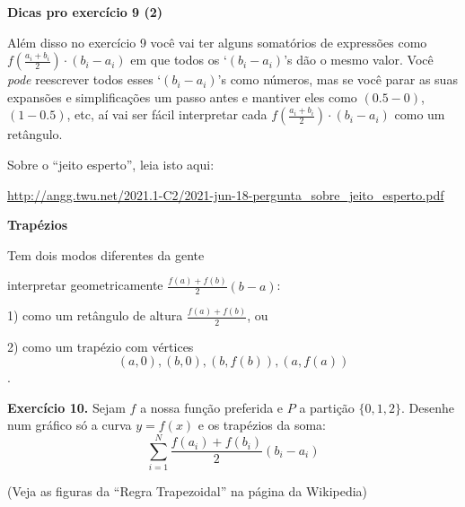 \documentclass[oneside,12pt]{article}
\begin{document}
\newpage

{\bf Dicas pro exercício 9 (2)}

Além disso no exercício 9 você vai ter alguns somatórios de expressões
como $f(\frac{a_i+b_i}{2})·(b_i-a_i)$ em que todos os `$(b_i-a_i)$'s
dão o mesmo valor. Você {\sl pode} reescrever todos esses
`$(b_i-a_i)$'s como números, mas se você parar as suas expansões e
simplificações um passo antes e mantiver eles como $(0.5 - 0)$, $(1 -
0.5)$, etc, aí vai ser fácil interpretar cada
$f(\frac{a_i+b_i}{2})·(b_i-a_i)$ como um retângulo.


\bsk

Sobre o ``jeito esperto'', leia isto aqui:

\ssk

{\scriptsize

\url{http://angg.twu.net/2021.1-C2/2021-jun-18-pergunta_sobre_jeito_esperto.pdf}

}



\newpage


{\bf Trapézios}

Tem dois modos diferentes da gente

interpretar geometricamente $\frac{f(a)+f(b)}{2} (b-a)$:

\msk

1) como um retângulo de altura $\frac{f(a)+f(b)}{2}$, ou

2) como um trapézio com vértices
%
$$(a,0), (b,0), (b,f(b)), (a,f(a))$$.

{\bf Exercício 10.} Sejam $f$ a nossa função preferida e $P$ a
partição $\{0,1,2\}$. Desenhe num gráfico só a curva $y=f(x)$ e os
trapézios da soma:
%
$$\sum_{i=1}^N \frac{f(a_i)+f(b_i)}{2} (b_i-a_i)$$

(Veja as figuras da ``Regra Trapezoidal'' na página da Wikipedia)


\newpage


\unitlength=10pt
\def\mypicture#1#2#3#4{{
    \sa{x0}{#1}
    \sa{y0}{#2}
    \sa{x1}{#3}
    \sa{y1}{#4}
    \vcenter{\hbox{%
    \beginpicture(0,0)(6,4)
    \pictgrid%
    \ColorOrange{
      \polygon*(\ga{x0},0)(\ga{x0},\ga{y0})(\ga{x1},\ga{y1})(\ga{x1},0)
    }
      \polygon(\ga{x0},0)(\ga{x0},\ga{y0})(\ga{x1},\ga{y1})(\ga{x1},0)
    \pictaxes%
    \end{picture}%
  }}}}
\end{document}
